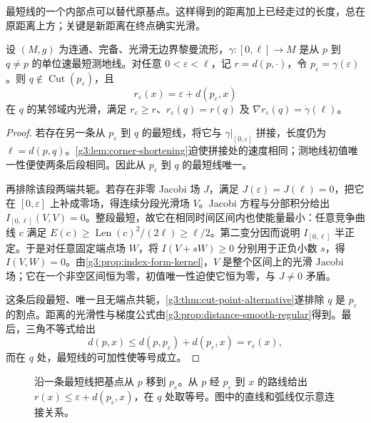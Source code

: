 最短线的一个内部点可以替代原基点。这样得到的距离加上已经走过的长度，总在原距离上方；关键是新距离在终点确实光滑。

\begin{lemma}\label{g3:lem:shifted-distance-smooth}
	设 \((M,g)\) 为连通、完备、光滑无边界黎曼流形，\(\gamma:[0,\ell]\to M\) 是从 \(p\) 到 \(q\ne p\) 的单位速最短测地线。对任意 \(0<\varepsilon<\ell\)，记 \(r=d(p,\cdot)\)，令 \(p_\varepsilon=\gamma(\varepsilon)\)。则 \(q\notin\operatorname{Cut}(p_\varepsilon)\)，且
	\begin{equation}\label{g3:eq:shifted-distance-support}
		r_\varepsilon(x)=\varepsilon+d(p_\varepsilon,x)
	\end{equation}
	在 \(q\) 的某邻域内光滑，满足 \(r_\varepsilon\ge r\)、\(r_\varepsilon(q)=r(q)\) 及 \(\nabla r_\varepsilon(q)=\dot\gamma(\ell)\)。
\end{lemma}
\begin{proof}
	若存在另一条从 \(p_\varepsilon\) 到 \(q\) 的最短线，将它与 \(\gamma|_{[0,\varepsilon]}\) 拼接，长度仍为 \(\ell=d(p,q)\)。\cref{g3:lem:corner-shortening}迫使拼接处的速度相同；测地线初值唯一性便使两条后段相同。因此从 \(p_\varepsilon\) 到 \(q\) 的最短线唯一。

	再排除该段两端共轭。若存在非零 Jacobi 场 \(J\)，满足 \(J(\varepsilon)=J(\ell)=0\)，把它在 \([0,\varepsilon]\) 上补成零场，得连续分段光滑场 \(V\)。Jacobi 方程与分部积分给出 \(I_{[0,\ell]}(V,V)=0\)。整段最短，故它在相同时间区间内也使能量最小：任意竞争曲线 \(c\) 满足 \(E(c)\ge\operatorname{Len}(c)^2/(2\ell)\ge\ell/2\)。第二变分因而说明 \(I_{[0,\ell]}\) 半正定。于是对任意固定端点场 \(W\)，将 \(I(V+sW)\ge0\) 分别用于正负小数 \(s\)，得 \(I(V,W)=0\)。由\cref{g3:prop:index-form-kernel}，\(V\) 是整个区间上的光滑 Jacobi 场；它在一个非空区间恒为零，初值唯一性迫使它恒为零，与 \(J\ne0\) 矛盾。

	这条后段最短、唯一且无端点共轭，\cref{g3:thm:cut-point-alternative}遂排除 \(q\) 是 \(p_\varepsilon\) 的割点。距离的光滑性与梯度公式由\cref{g3:prop:distance-smooth-regular}得到。最后，三角不等式给出
	\[
		d(p,x)\le d(p,p_\varepsilon)+d(p_\varepsilon,x)=r_\varepsilon(x),
	\]
	而在 \(q\) 处，最短线的可加性使等号成立。
\end{proof}

\begin{figure}[htbp]
	\centering
	
	\caption[移动基点构造距离的上支撑]{沿一条最短线把基点从 \(p\) 移到 \(p_\varepsilon\)。从 \(p\) 经 \(p_\varepsilon\) 到 \(x\) 的路线给出 \(r(x)\le\varepsilon+d(p_\varepsilon,x)\)，在 \(q\) 处取等号。图中的直线和弧线仅示意连接关系。}
	\label{g3:fig:distance-support}
\end{figure}

